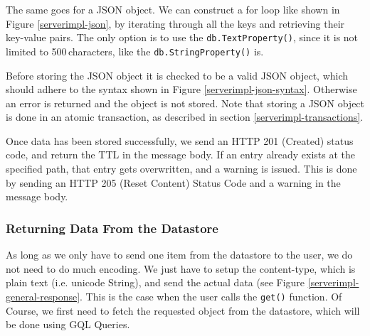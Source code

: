 The same goes for a JSON object. We can construct a for loop like shown in Figure
\ref{serverimpl-json}, by iterating through all the keys and retrieving their
key-value pairs. The only option is to use the \texttt{db.TextProperty()}, since
it is not limited to 500\,characters, like the \texttt{db.StringProperty()} is.

Before storing the JSON object it is checked to be a valid JSON object, which
should adhere to the syntax shown in Figure \ref{serverimpl-json-syntax}.
Otherwise an error is returned and the object is not stored. Note that storing a
JSON object is done in an atomic transaction, as described in section
\ref{serverimpl-transactions}.

Once data has been stored successfully, we send an HTTP 201 (Created) status
code, and return the TTL in the message body. If an entry already exists at the
specified path, that entry gets overwritten, and a warning is issued. This is
done by sending an HTTP 205 (Reset Content) Status Code and a warning in the
message body.

\begin{figure*}[ht] %
\begin{center}
\begin{code}
\end{code}
\caption{Advert syntax of a JSON object.\label{serverimpl-json-syntax}}
\end{center}
\end{figure*}


\subsubsection{Returning Data From the Datastore}
As long as we only have to send one item from the datastore to the user, we do
not need to do much encoding. We just have to setup the content-type, which is
plain text (i.e. unicode String), and send the actual data (see Figure
\ref{serverimpl-general-response}. This is the case when the user calls the
\texttt{get()} function. Of Course, we first need to fetch the requested object
from the datastore, which will be done using GQL Queries.

